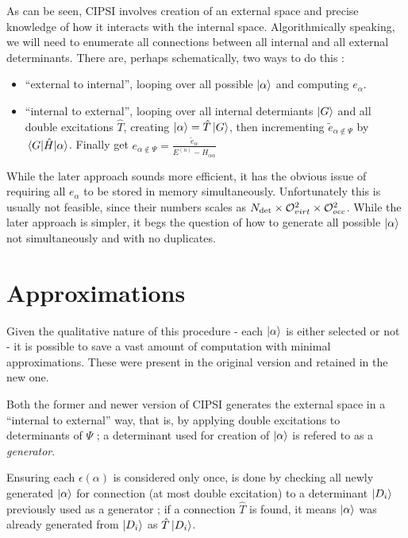 \documentclass[./thesis.tex]{subfiles}
\begin{document}
As can be seen, CIPSI involves creation of an external space and precise knowledge of how it interacts with the internal space. Algorithmically speaking, we will need to enumerate all connections between all internal and all external determinants.
There are, perhaps schematically, two ways to do this :

\begin{itemize}
\item
``external to internal'', looping over all possible ${\ket{\alpha}}$ and computing $e_\alpha$.
\item
``internal to external'', looping over all internal determiants $\ket G$ and all double excitations $\hat T$, creating ${\ket{\alpha}} = \hat T \ket G$, then incrementing $\tilde e_{\alpha \notin \Psi}$ by $\mel{G}{\hat{H}}{\alpha}$. Finally get $e_{\alpha \notin \Psi} = \frac{\tilde e_\alpha}{E^{(n)} - H_{\alpha \alpha}}$
\end{itemize}

While the later approach sounds more efficient, it has the obvious issue of requiring all $e_\alpha$ to be stored in memory simultaneously. Unfortunately this is usually not feasible, since their numbers scales as ${N_\text{det}} \times \mathcal{O}_{virt}^2 \times \mathcal{O}_{occ}^2$.
While the later approach is simpler, it begs the question of how to generate all possible ${\ket{\alpha}}$ not simultaneously and with no duplicates. 


\section{Approximations}

Given the qualitative nature of this procedure - each ${\ket{\alpha}}$ is either selected or not - it is possible to save a vast amount of computation with minimal approximations. These were present in the original version and retained in the new one.

Both the former and newer version of CIPSI generates the external space in a ``internal to external'' way, that is, by applying double excitations to determinants of $\Psi$ ; a determinant used for creation of ${\ket{\alpha}}$ is refered to as a \emph{generator}.

Ensuring each $\epsilon(\alpha)$ is considered only once, is done by checking all newly generated ${\ket{\alpha}}$ for connection (at most double excitation) to a determinant $\ket {D_i}$ previously used as a generator ; if a connection $\hat T$ is found, it means ${\ket{\alpha}}$ was already generated from $\ket {D_i}$ as $\hat T \ket {D_i}$.
\end{document}
